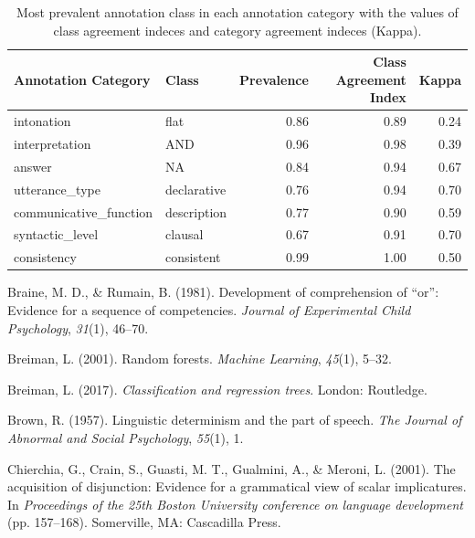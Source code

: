 \documentclass[,man,floatsintext]{apa6}
\begin{document}
\begin{table}[t]

\caption{\label{tab:andAgreeStats}Most prevalent annotation class in each annotation category with the values of class agreement indeces and category agreement indeces (Kappa).}
\centering
\begin{tabular}{l|l|r|r|r}
\hline
Annotation Category & Class & Prevalence & Class Agreement Index & Kappa\\
\hline
intonation & flat & 0.86 & 0.89 & 0.24\\
\hline
interpretation & AND & 0.96 & 0.98 & 0.39\\
\hline
answer & NA & 0.84 & 0.94 & 0.67\\
\hline
utterance\_type & declarative & 0.76 & 0.94 & 0.70\\
\hline
communicative\_function & description & 0.77 & 0.90 & 0.59\\
\hline
syntactic\_level & clausal & 0.67 & 0.91 & 0.70\\
\hline
consistency & consistent & 0.99 & 1.00 & 0.50\\
\hline
\end{tabular}
\end{table}

\setlength{\parindent}{-0.5in}
\setlength{\leftskip}{0.5in}

\hypertarget{refs}{}
\leavevmode\hypertarget{ref-braine1981development}{}%
Braine, M. D., \& Rumain, B. (1981). Development of comprehension of ``or'': Evidence for a sequence of competencies. \emph{Journal of Experimental Child Psychology}, \emph{31}(1), 46--70.

\leavevmode\hypertarget{ref-breiman2001random}{}%
Breiman, L. (2001). Random forests. \emph{Machine Learning}, \emph{45}(1), 5--32.

\leavevmode\hypertarget{ref-breiman2017classification}{}%
Breiman, L. (2017). \emph{Classification and regression trees}. London: Routledge.

\leavevmode\hypertarget{ref-brown1957linguistic}{}%
Brown, R. (1957). Linguistic determinism and the part of speech. \emph{The Journal of Abnormal and Social Psychology}, \emph{55}(1), 1.

\leavevmode\hypertarget{ref-chierchia2001acquisition}{}%
Chierchia, G., Crain, S., Guasti, M. T., Gualmini, A., \& Meroni, L. (2001). The acquisition of disjunction: Evidence for a grammatical view of scalar implicatures. In \emph{Proceedings of the 25th Boston University conference on language development} (pp. 157--168). Somerville, MA: Cascadilla Press.
\end{document}
